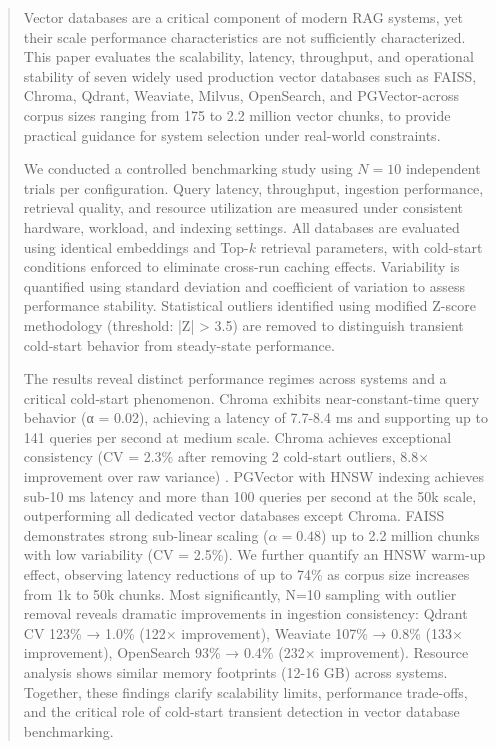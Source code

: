 \documentclass{article}
\begin{document}
\begin{abstract}
Vector databases are a critical component of modern RAG systems, yet their scale performance characteristics are not sufficiently characterized. This paper evaluates the scalability, latency, throughput, and operational stability of seven widely used production vector databases such as FAISS, Chroma, Qdrant, Weaviate, Milvus, OpenSearch, and PGVector-across corpus sizes ranging from 175 to 2.2 million vector chunks, to provide practical guidance for system selection under real-world constraints.

We conducted a controlled benchmarking study using $N = 10$ independent trials per configuration. Query latency, throughput, ingestion performance, retrieval quality, and resource utilization are measured under consistent hardware, workload, and indexing settings. All databases are evaluated using identical embeddings and Top-$k$ retrieval parameters, with cold-start conditions enforced to eliminate cross-run caching effects. Variability is quantified using standard deviation and coefficient of variation to assess performance stability. Statistical outliers identified using modified Z-score methodology (threshold: |Z| > 3.5) are removed to distinguish transient cold-start behavior from steady-state performance.

The results reveal distinct performance regimes across systems and a critical cold-start phenomenon. Chroma exhibits near-constant-time query behavior (α = 0.02), achieving a latency of 7.7-8.4 ms and supporting up to 141 queries per second at medium scale. Chroma achieves exceptional consistency (CV = 2.3\% after removing 2 cold-start outliers, 8.8× improvement over raw variance) . PGVector with HNSW indexing achieves sub-10 ms latency and more than 100 queries per second at the 50k scale, outperforming all dedicated vector databases except Chroma. FAISS demonstrates strong sub-linear scaling ($\alpha = 0.48$) up to 2.2 million chunks with low variability (CV = 2.5\%). We further quantify an HNSW warm-up effect, observing latency reductions of up to 74\% as corpus size increases from 1k to 50k chunks. Most significantly, N=10 sampling with outlier removal reveals dramatic improvements in ingestion consistency: Qdrant CV 123\% → 1.0\% (122× improvement), Weaviate 107\% → 0.8\% (133× improvement), OpenSearch 93\% → 0.4\% (232× improvement). Resource analysis shows similar memory footprints (12-16 GB) across systems. Together, these findings clarify scalability limits, performance trade-offs, and the critical role of cold-start transient detection in vector database benchmarking.
\end{abstract}
\end{document}
